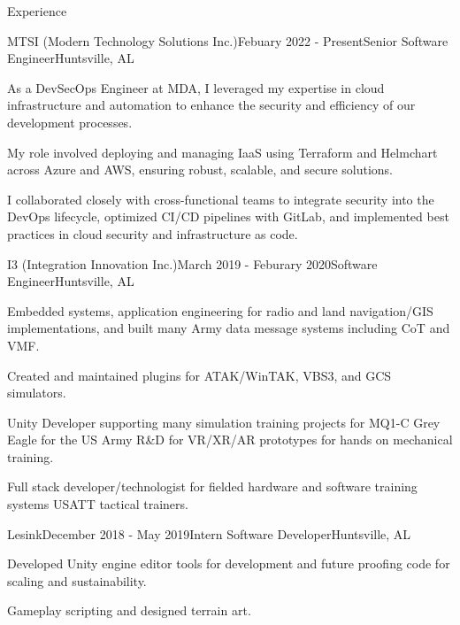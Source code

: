 \documentclass[
	11pt, %
]{crumpcv} %
\begin{document}
\begin{rSection}{Experience}

	\begin{rSubsection}{MTSI (Modern Technology Solutions Inc.)}{Febuary 2022 - Present}{Senior Software Engineer}{Huntsville, AL}
		\item As a DevSecOps Engineer at MDA, I leveraged my expertise in cloud infrastructure and automation to enhance the security and efficiency of our development processes. 
		\item My role involved deploying and managing IaaS using Terraform and Helmchart across Azure and AWS, ensuring robust, scalable, and secure solutions. 
		\item I collaborated closely with cross-functional teams to integrate security into the DevOps lifecycle, optimized CI/CD pipelines with GitLab, and implemented best practices in cloud security and infrastructure as code.
	\end{rSubsection}


	\begin{rSubsection}{I3 (Integration Innovation Inc.)}{March 2019 - Feburary 2020}{Software Engineer}{Huntsville, AL}
		\item Embedded systems, application engineering for radio and land navigation/GIS implementations, and built many Army data message systems including CoT and VMF. 
		\item Created and maintained plugins for ATAK/WinTAK, VBS3, and GCS simulators.
		\item Unity Developer supporting many simulation training projects for MQ1-C Grey Eagle for the US Army R&D for VR/XR/AR prototypes for hands on mechanical training.
		\item Full stack developer/technologist for fielded hardware and software training systems USATT tactical trainers.
	\end{rSubsection}


	\begin{rSubsection}{Lesink}{December 2018 - May 2019}{Intern Software Developer}{Huntsville, AL}
		\item Developed Unity engine editor tools for development and future proofing code for scaling and sustainability.
		\item Gameplay scripting and designed terrain art.
	\end{rSubsection}


\end{rSection}
\end{document}
